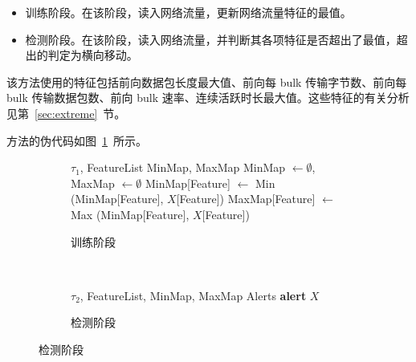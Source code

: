 {\begin{itemize}
    \item 训练阶段。在该阶段，读入网络流量，更新网络流量特征的最值。
    \item 检测阶段。在该阶段，读入网络流量，并判断其各项特征是否超出了最值，超出的判定为横向移动。
\end{itemize}

该方法使用的特征包括前向数据包长度最大值、前向每 bulk 传输字节数、前向每 bulk 传输数据包数、前向 bulk 速率、连续活跃时长最大值。这些特征的有关分析见第~\ref{sec:extreme}~节。

方法的伪代码如图~\ref{fig:detect-code}~所示。

\begin{figure}[t]
    \centering
    \begin{subfigure}[b]{1.0\textwidth}
        \hrulefill
        \begin{algorithmic}[1]
            \Require $\tau_1$, FeatureList
            \Ensure MinMap, MaxMap
                \State MinMap $\gets \emptyset$, MaxMap $\gets \emptyset$
                        \State MinMap[Feature] $\gets $ Min (MinMap[Feature], $X$[Feature])
                        \State MaxMap[Feature] $\gets $ Max (MinMap[Feature], $X$[Feature])
                    \EndFor
                \EndFor
            \EndFunction
            \end{algorithmic}
        \hrulefill
        \caption{训练阶段}
    \end{subfigure}
    \\
    \begin{subfigure}[b]{1.0\textwidth}
        \hrulefill
            \begin{algorithmic}[1]
            \Require $\tau_2$, FeatureList, MinMap, MaxMap
            \Ensure Alerts
                            \State \textbf{alert} $X$
                        \EndIf
                    \EndFor
                \EndFor
            \EndFunction
            \end{algorithmic}
        \hrulefill
        \caption{检测阶段}
    \end{subfigure}
    \label{fig:detect-code}
\end{figure}

}
